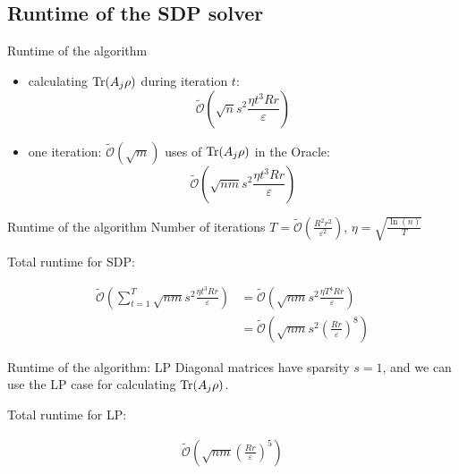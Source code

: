 \subsection{Runtime of the SDP solver}
\begin{frame}{Runtime of the algorithm}
\begin{itemize}
\item calculating $\operatorname{Tr}(A_j\rho)$ during iteration $t$:
\begin{equation*}
\tilde{\mathcal{O}}\left(\sqrt{n}s^2\frac{\eta t^3 Rr}{\varepsilon}\right)
\end{equation*}
\pause
\item one iteration: $\tilde{\mathcal{O}}(\sqrt{m})$ uses of $\operatorname{Tr}(A_j\rho)$ in the Oracle:
\begin{equation*}
\tilde{\mathcal{O}}\left(\sqrt{nm}s^2\frac{\eta t^3 Rr}{\varepsilon}\right)
\end{equation*}
\pause
\end{itemize}
\end{frame}

\begin{frame}{Runtime of the algorithm}
Number of iterations $T=\tilde{\mathcal{O}}\left(\frac{R^2 r^2}{\varepsilon^2}\right)$, $\eta=\sqrt{\frac{\ln(n)}{T}}$

\vspace{1cm} 

Total runtime for SDP:

\begin{align*}
\tilde{\mathcal{O}}\left(\sum_{t=1}^T \sqrt{nm}s^2\frac{\eta t^3 Rr}{\varepsilon}\right)&=\tilde{\mathcal{O}}\left(\sqrt{nm}s^2\frac{\eta T^4 Rr}{\varepsilon}\right)\\
&=\tilde{\mathcal{O}}\left(\sqrt{nm}s^2\left(\frac{Rr}{\varepsilon}\right)^8\right)
\end{align*}

\end{frame}

\begin{frame}{Runtime of the algorithm: LP}
Diagonal matrices have sparsity $s=1$, and we can use the LP case for calculating $\operatorname{Tr}(A_j\rho)$.

\vspace{1cm} 

Total runtime for LP:

\begin{align*}
\tilde{\mathcal{O}}\left(\sqrt{nm}\left(\frac{Rr}{\varepsilon}\right)^5\right)
\end{align*}

\end{frame}

